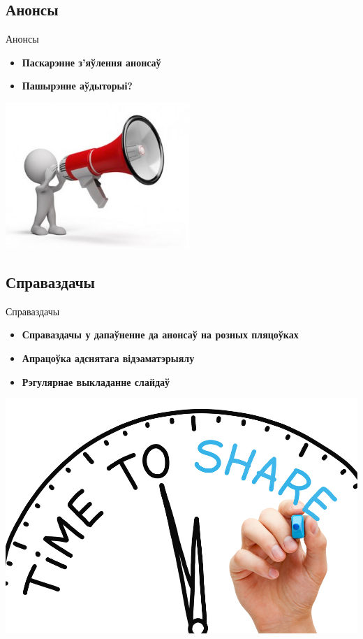 \documentclass[ignorenonframetext,hyperref={pdftex,unicode}]{beamer}
\begin{document}
\subsection{Анонсы}
\begin{frame}{Анонсы}
	\begin{itemize}
		\item \textbf{Паскарэнне з'яўлення анонсаў}
		\item \textbf{Пашырэнне аўдыторыі?}
	\end{itemize}
	\begin{center}
		\includegraphics[height=156pt]{survey-announce}
	\end{center}
\end{frame}

\subsection{Справаздачы}
\begin{frame}{Справаздачы}
	\begin{itemize}
		\item \textbf{Справаздачы у дапаўненне да анонсаў на розных пляцоўках}
		\item \textbf{Апрацоўка адснятага відэаматэрыялу}
		\item \textbf{Рэгулярнае выкладанне слайдаў}
	\end{itemize}
	\begin{center}
		\includegraphics{Time-to-Share}
	\end{center}
\end{frame}
\end{document}
